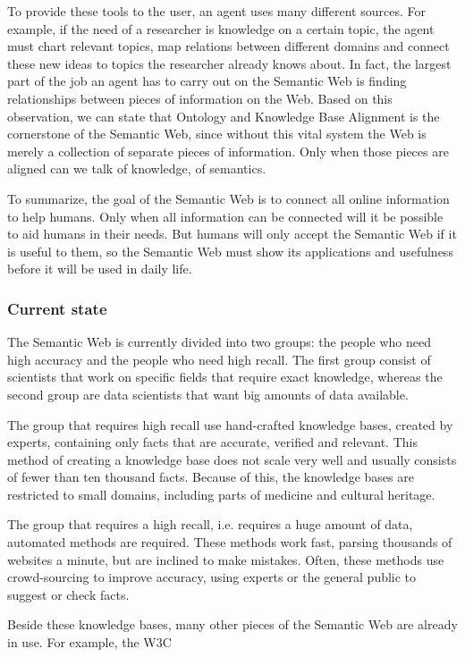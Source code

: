 \documentclass{article}
\begin{document}
 To provide these tools to the user, an agent uses many different sources. For example, if the need of a researcher is knowledge on a certain topic, the agent must chart relevant topics, map relations between different domains and connect these new ideas to topics the researcher already knows about. In fact, the largest part of the job an agent has to carry out on the Semantic Web is finding relationships between pieces of information on the Web. Based on this observation, we can state that Ontology and Knowledge Base Alignment is the cornerstone  of the Semantic Web, since without this vital system the Web is merely a collection of separate pieces of information. Only when those pieces are aligned can we talk of knowledge, of semantics.
 
 To summarize, the goal of the Semantic Web is to connect all online information to help humans. Only when all information can be connected will it be possible to aid humans in their needs. But humans will only accept the Semantic Web if it is useful to them, so the Semantic Web must show its applications and usefulness before it will be used in daily life.
 \subsubsection{Current state}
 The Semantic Web is currently divided into two groups: the people who need high accuracy and the people who need high recall. The first group consist of scientists that work on specific fields that require exact knowledge, whereas the second group are data scientists that want big amounts of data available.
 
 The group that requires high recall use hand-crafted knowledge bases, created by experts, containing only facts that are accurate, verified and relevant. This method of creating a knowledge base does not scale very well and usually consists of fewer than ten thousand facts. Because of this, the knowledge bases are restricted to small domains, including parts of medicine and cultural heritage. %
 
 The group that requires a high recall, i.e. requires a huge amount of data, automated methods are required. These methods work fast, parsing thousands of websites a minute, but are inclined to make mistakes. Often, these methods use crowd-sourcing to improve accuracy, using experts or the general public to suggest or check facts. %
 
 Beside these knowledge bases, many other pieces of the Semantic Web are already in use. For example, the W3C %
 
\end{document}
